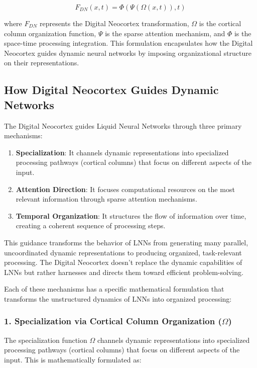 \documentclass{article}
\begin{document}
\begin{equation}
F_{DN}(x, t) = \Phi(\Psi(\Omega(x, t)), t)
\end{equation}

where $F_{DN}$ represents the Digital Neocortex transformation, $\Omega$ is the cortical column organization function, $\Psi$ is the sparse attention mechanism, and $\Phi$ is the space-time processing integration. This formulation encapsulates how the Digital Neocortex guides dynamic neural networks by imposing organizational structure on their representations.

\subsection{How Digital Neocortex Guides Dynamic Networks}
The Digital Neocortex guides Liquid Neural Networks through three primary mechanisms:

\begin{enumerate}
    \item \textbf{Specialization}: It channels dynamic representations into specialized processing pathways (cortical columns) that focus on different aspects of the input.
    \item \textbf{Attention Direction}: It focuses computational resources on the most relevant information through sparse attention mechanisms.
    \item \textbf{Temporal Organization}: It structures the flow of information over time, creating a coherent sequence of processing steps.
\end{enumerate}

This guidance transforms the behavior of LNNs from generating many parallel, uncoordinated dynamic representations to producing organized, task-relevant processing. The Digital Neocortex doesn't replace the dynamic capabilities of LNNs but rather harnesses and directs them toward efficient problem-solving.

Each of these mechanisms has a specific mathematical formulation that transforms the unstructured dynamics of LNNs into organized processing:

\subsubsection{1. Specialization via Cortical Column Organization ($\Omega$)}
The specialization function $\Omega$ channels dynamic representations into specialized processing pathways (cortical columns) that focus on different aspects of the input. This is mathematically formulated as:
\end{document}
